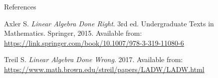 \documentclass [aspectratio=169]{beamer}
\begin{document}
\begin{frame}{References}

Axler S. \textit{Linear Algebra Done Right}. 3rd ed. Undergraduate Texts in Mathematics. Springer, 2015.
Available from: \href{https://link.springer.com/book/10.1007/978-3-319-11080-6}{https://link.springer.com/book/10.1007/978-3-319-11080-6} 

\vspace{1em}


\indent Treil S. \textit{Linear Algebra Done Wrong}. 2017. Available from: \href{https://www.math.brown.edu/streil/papers/LADW/LADW.html}{https://www.math.brown.edu/streil/papers/LADW/LADW.html}
\end{frame}
\end{document}
